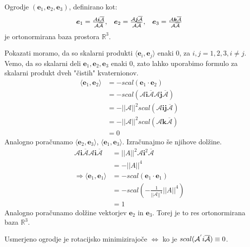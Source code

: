 \documentclass[mat1]{fmfdelo}
\newcommand{\R}{\mathbb R}
\newcommand{\ii}{\boldsymbol i}
\newcommand{\jj}{\boldsymbol j}
\newcommand{\kk}{\boldsymbol k}
\newcommand{\e}{\boldsymbol e}
\newcommand{\A}{\mathcal A}
\begin{document}
\begin{trditev}
Ogrodje $(\e_1,\e_2,\e_3)$, definirano kot: 
\begin{equation*}
\begin{array}{c c c}
\e_1 = \frac{\A\ii\overline{\A}}{\A\overline{\A}}, &
\e_2 = \frac{\A\jj\overline{\A}}{\A\overline{\A}}, &
\e_3 = \frac{\A\kk\overline{\A}}{\A\overline{\A}}
\end{array}
\end{equation*}
je ortonormirana baza prostora $\R^3$.
\end{trditev}
\begin{dokaz}
Pokazati moramo, da so skalarni produkti $\langle \e_i, \e_j \rangle $ enaki 0, za $i, j = 1,2,3, i \neq j$. Vemo, da so skalarni deli $\e_1,\e_2,\e_3$ enaki 0, zato lahko uporabimo formulo za skalarni produkt dveh "čistih" kvaternionov.
\begin{equation*}
\begin{split}
	\langle \e_1,\e_2 \rangle& = -scal \left( \e_1 \cdot \e_2 \right) \\
	& = -scal \left( \A \ii \overline{\A} \A \jj \overline{\A} \right) \\
	&= - ||\A||^2 scal \left( \A \ii \jj \overline{\A} \right) \\
	& = - ||\A||^2 scal \left( \A \kk \overline{\A} \right) \\
	& = 0
\end{split}
\end{equation*}
Analogno poračunamo $\langle \e_2,\e_3 \rangle$, $\langle \e_1,\e_3 \rangle$.
Izračunajmo še njihove dolžine.
\begin{equation*}
\begin{split}
\A \ii \overline{\A} \A \ii \overline{\A} 	&= ||A||^2 \A \ii^2 \overline{\A} \\
	&= -||A||^4 \\
	\Longrightarrow \langle \e_1,\e_1 \rangle &= -scal \left( \e_1 \cdot \e_1 \right) \\
	&= -scal (-\frac{1}{||\A||^4}||A||^4) \\
	&= 1
\end{split}
\end{equation*}
Analogno poračunamo dolžine vektorjev $\e_2$ in $\e_3$. Torej je to res ortonormirana baza $\R^3$.
\end{dokaz}
\begin{trditev}
	Usmerjeno ogrodje je rotacijsko minimizirajoče $\Leftrightarrow$ ko je $scal(\A^{'} \\i\overline{\A})\equiv0$.
\end{trditev}
\end{document}
